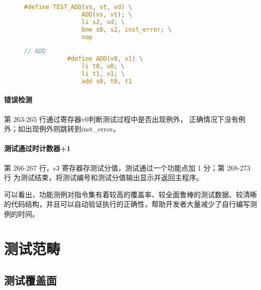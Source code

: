 \begin{enumerate}
    \begin{figure}[H]
        \centering
        \begin{minipage}{0.4\textwidth}
            \begin{lstlisting}[emph={ADD}, language=c]
            #define TEST_ADD(vs, vt, vd) \
                ADD(vs, vt); \
                li s2, vd; \
                bne s0, s2, inst_error; \
                nop
            \end{lstlisting}
        \end{minipage}
        \hspace{0.5cm}
        \begin{minipage}{0.4\textwidth}
            \begin{lstlisting}[language=c]
            // ADD
            #define ADD(v0, v1) \
                li t0, v0; \
                li t1, v1; \
                add s0, t0, t1
            \end{lstlisting}
        \end{minipage}
    \end{figure}

    \paragraph{错误检测}
    第 263-265 行通过寄存器v0判断测试过程中是否出现例外，
    正确情况下没有例外；如出现例外则跳转到inst\_error。

    \paragraph{测试通过时计数器+1}
    第 266-267 行，s3 寄存器存测试分值，测试通过一个功能点加 1 分；第 268-273 行
    为测试结束，将测试编号和测试分值输出显示并返回主程序。

\end{enumerate}

可以看出，功能测例对指令集有着较高的覆盖率、较全面鲁棒的测试数据、较清晰的代码结构，并且可以自动验证执行的正确性，帮助开发者大量减少了自行编写测例的时间。

\section{测试范畴}

\subsection{测试覆盖面}

